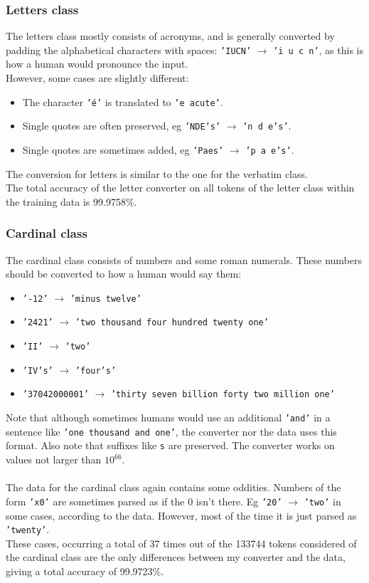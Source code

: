 \documentclass[a4paper, 9pt]{extarticle}
\newcommand{\code}{\texttt}
\newcommand{\str}[1]{\texttt{'#1'}}
\begin{document}
\subsubsection{Letters class}
The letters class mostly consists of acronyms, and is generally converted by padding the alphabetical characters with spaces: \str{IUCN} $\to$ \str{i u c n}, as this is how a human would pronounce the input.\\
However, some cases are slightly different:
\begin{itemize}
    \itemsep-0.3em
    \item The character \str{é} is translated to \str{e acute}.
    \item Single quotes are often preserved, eg \str{NDE's} $\to$ \str{n d e's}. 
    \item Single quotes are sometimes added, eg \str{Paes} $\to$ \str{p a e's}.
\end{itemize}
The conversion for letters is similar to the one for the verbatim class.\\
The total accuracy of the letter converter on all tokens of the letter class within the training data is 99.9758\%.

\subsubsection{Cardinal class}
The cardinal class consists of numbers and some roman numerals. These numbers should be converted to how a human would say them:
\begin{itemize}
    \itemsep-0.3em
    \item \str{-12} $\to$ \str{minus twelve}
    \item \str{2421} $\to$ \str{two thousand four hundred twenty one}
    \item \str{II} $\to$ \str{two}
    \item \str{IV's} $\to$ \str{four's}
    \item \str{37042000001} $\to$ \str{thirty seven billion forty two million one}
\end{itemize}
Note that although sometimes humans would use an additional \str{and} in a sentence like \str{one thousand and one}, the converter nor the data uses this format. Also note that suffixes like \code{s} are preserved. The converter works on values not larger than $10^{66}$.\\
\\
The data for the cardinal class again contains some oddities. Numbers of the form \str{x0} are sometimes parsed as if the 0 isn't there. Eg \str{20} $\to$ \str{two} in some cases, according to the data. However, most of the time it is just parsed as \str{twenty}.\\
These cases, occurring a total of 37 times out of the 133744 tokens considered of the cardinal class are the only differences between my converter and the data, giving a total accuracy of 99.9723\%.
\end{document}
